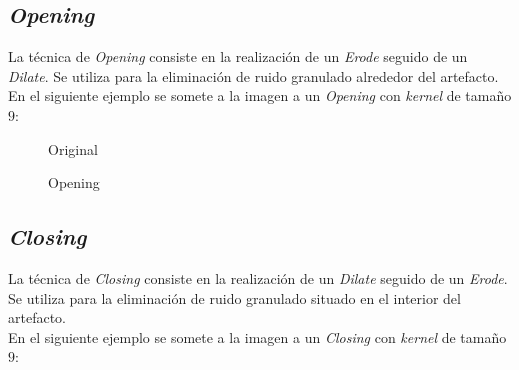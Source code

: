 \subsection{\emph{Opening}}
La técnica de \emph{Opening} consiste en la realización de un
\emph{Erode} seguido de un \emph{Dilate}. Se utiliza para la
eliminación de ruido granulado alrededor del artefacto.\\
En el siguiente ejemplo se somete a la imagen a un \emph{Opening} con
\emph{kernel} de tamaño $9$:

\begin{figure}[H]
  \caption{Original}
  \centering \setlength\fboxsep{0pt} \setlength\fboxrule{0.5pt}
\end{figure}

\begin{figure}[H]
  \centering \setlength\fboxsep{0pt} \setlength\fboxrule{0.5pt}
  \caption{Opening}
\end{figure}

\subsection{\emph{Closing}}
La técnica de \emph{Closing} consiste en la realización de un
\emph{Dilate} seguido de un \emph{Erode}. Se utiliza para la
eliminación de ruido granulado situado en el interior del
artefacto. \\
En el siguiente ejemplo se somete a la imagen a un \emph{Closing} con
\emph{kernel} de tamaño $9$:

